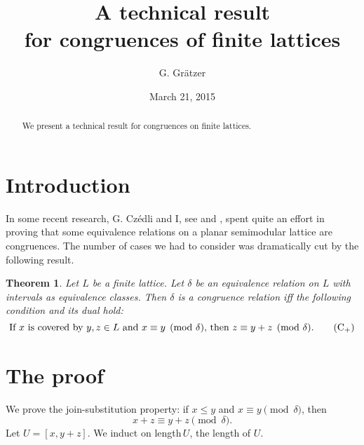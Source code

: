 \documentclass{amsart}
\newtheorem{theorem}{Theorem}
\begin{document}
\title{A technical result\\ for congruences of finite lattices}  
\author{G. Gr\"atzer} 
\address{Department of Mathematics\\
  University of Manitoba\\
  Winnipeg, MB R3T 2N2\\
  Canada}
\date{March 21, 2015}
\begin{abstract}
We present a technical result for congruences on finite lattices.
\end{abstract}
\maketitle

\section{Introduction}\label{S:Introduction}%
In some recent research, G. Cz\'edli
and I, see \cite{gC13} and \cite{gG14}, spent quite an effort
in proving that some equivalence relations 
on a planar semimodular lattice are congruences. 
The number of cases we had to consider
was dramatically cut by the following result.

\begin{theorem}\label{T:technical}%
Let $L$ be a finite lattice. 
Let $\delta$ be an equivalence relation on $L$
with intervals as equivalence classes.
Then $\delta$ is a congruence relation if{}f 
the following condition and its dual hold:
\begin{equation}
\text{If $x$ is covered by $y,z \in L$ 
and $x \equiv y \pmod{\delta}$,
then $z \equiv y + z \pmod{\delta}$.}\tag{C${}_{+}$}
\end{equation}
\end{theorem}

\section{The proof}\label{Proof}%
We prove the join-substitution property:  
if $x \leq y$ and $x \equiv y \pmod{\delta}$, then
\begin{equation}\label{E:Cjoin}%
x + z \equiv y + z \pmod{\delta}.
\end{equation}
Let $U = [x, y+ z]$.
We induct on length\,$U$, the length of $U$.  
\end{document}
